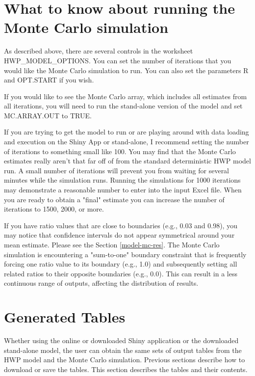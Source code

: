 \documentclass[
  openany]{book}
\begin{document}
\hypertarget{own-mc}{%
\section{What to know about running the Monte Carlo simulation}\label{own-mc}}

As described above, there are several controls in the worksheet HWP\_MODEL\_OPTIONS. You can set the number of iterations that you would like the Monte Carlo simulation to run. You can also set the parameters R and OPT.START if you wish.

If you would like to see the Monte Carlo array, which includes all estimates from all iterations, you will need to run the stand-alone version of the model and set MC.ARRAY.OUT to TRUE.

If you are trying to get the model to run or are playing around with data loading and execution on the Shiny App or stand-alone, I recommend setting the number of iterations to something small like 100. You may find that the Monte Carlo estimates really aren't that far off of from the standard deterministic HWP model run. A small number of iterations will prevent you from waiting for several minutes while the simulation runs. Running the simulations for 1000 iterations may demonstrate a reasonable number to enter into the input Excel file. When you are ready to obtain a "final" estimate you can increase the number of iterations to 1500, 2000, or more.

If you have ratio values that are close to boundaries (e.g., 0.03 and 0.98), you may notice that confidence intervals do not appear symmetrical around your mean estimate. Please see the Section \ref{model-mc-res}. The Monte Carlo simulation is encountering a "sum-to-one" boundary constraint that is frequently forcing one ratio value to its boundary (e.g., 1.0) and subsequently setting all related ratios to their opposite boundaries (e.g., 0.0). This can result in a less continuous range of outputs, affecting the distribution of results.

\hypertarget{own-tables}{%
\section{Generated Tables}\label{own-tables}}

Whether using the online or downloaded Shiny application or the downloaded stand-alone model, the user can obtain the same sets of output tables from the HWP model and the Monte Carlo simulation. Previous sections describe how to download or save the tables. This section describes the tables and their contents.
\end{document}
